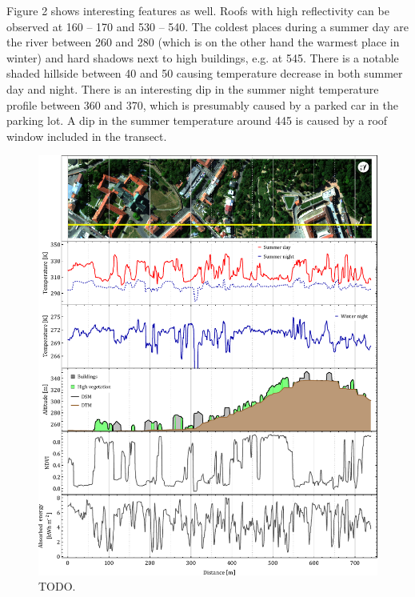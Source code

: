 \begin{appendices}
Figure 2 shows interesting features as well. Roofs with high reflectivity can be observed at 160 – 170 and 530 – 540. The coldest places during a summer day are the river between 260 and 280 (which is on the other hand the warmest place in winter) and hard shadows next to high buildings, e.g. at 545. There is a notable shaded hillside between 40 and 50 causing temperature decrease in both summer day and night. There is an interesting dip in the summer night temperature profile between 360 and 370, which is presumably caused by a parked car in the parking lot. A dip in the summer temperature around 445 is caused by a roof window included in the transect.


\newpage
\begin{figure}[!t]
\centering
\includegraphics[width=\linewidth]{pics/Appendix_B/Transect_1.pdf}
\vspace{1.5 em}
\caption{TODO.}
\label{fig:Transect1}
\end{figure}


\end{appendices}

